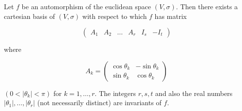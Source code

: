 Let $f$ be an automorphism of the euclidean space $(V, \sigma)$. Then there exists a cartesian basis of $(V, \sigma)$ with respect to which $f$ has matrix

$$\begin{pmatrix}
A_1 & A_2 & \dots & A_r & I_s & -I_t
\end{pmatrix}$$

where

$$A_k = \begin{pmatrix}
\cos \theta_k & -\sin \theta_k \\
\sin \theta_k & \cos \theta_k
\end{pmatrix}$$

$(0 < |\theta_k| < \pi)$ for $k = 1, \dots, r$. The integers $r, s, t$ and also the real numbers $|\theta_1|, \dots, |\theta_r|$ (not necessarily distinct) are invariants of $f$.
